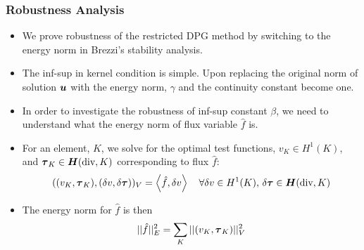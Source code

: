 \documentclass{beamer}
\begin{document}
\begin{frame}
\frametitle{Robustness Analysis}
\begin{itemize}
  \item We prove robustness of the restricted DPG method by switching to the
    energy norm in Brezzi's stability analysis.
  \item The inf-sup in kernel condition is simple. Upon replacing the original
    norm of solution $\boldsymbol u$ with the energy norm, $\gamma$ and the continuity
    constant become one.
  \item In order to investigate the robustness of inf-sup constant $\beta$, we
    need to understand what the energy norm of flux variable $\hat f$ is.
  \item For an element, $K$, we solve for the optimal test functions,
    $v_K\in H^1(K)$, and $\boldsymbol\tau_K\in\mbox{\boldmath $H$}(\text{div},K)$
    corresponding to flux $\hat f$:
    \[
    ( (v_K,\boldsymbol\tau_K),(\delta v,\delta\boldsymbol\tau) )_V=\left\langle \hat f,\delta v \right\rangle
    \quad\forall\delta v\in H^1(K),\,\delta\boldsymbol\tau\in\mbox{\boldmath $H$}(\text{div},K)
    \]
  \item The energy norm for $\hat f$ is then
    \[
    ||\hat f||_E^2=\sum_K||(v_K,\boldsymbol\tau_K)||_V^2
    \]
\end{itemize}
\end{frame}

\end{document}

